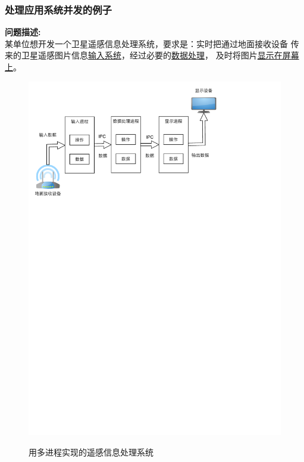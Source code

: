 \documentclass[compress]{beamer}
\begin{document}
\begin{frame}
  \frametitle{处理应用系统并发的例子}

  \label{app:satallite}
   {
    \textbf{问题描述:} \\[2ex]
    某单位想开发一个卫星遥感信息处理系统，要求是：实时把通过地面接收设备
    传来的卫星遥感图片信息\uline{输入系统}，经过必要的\uline{数据处理}，
    及时将图片\uline{显示在屏幕上}。
  }

   {
  \centering\begin{figure}
  \includegraphics[width=0.9\hsize]{yaogan-processes.pdf}

  用多进程实现的遥感信息处理系统
  \end{figure}
  }


\end{frame}
\end{document}
